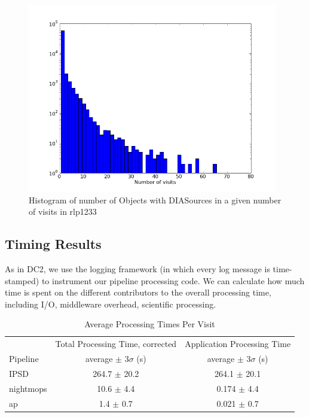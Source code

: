 \begin{figure}[htb]
\begin{center}
\includegraphics[height=3.25in]{images/rlp1233DiffLCHisto.png}
\caption{Histogram of number of Objects with DIASources in a given number of
  visits in rlp1233}  
\label{fig:lightcurve1}
\end{center}
\end{figure}

  

\subsection{Timing Results}
\label{sec:timing}

As in DC2, we use the logging framework (in which every log message is
time-stamped) to instrument our pipeline processing code.  We can
calculate how much time is spent on the different contributors to the
overall processing time, including I/O, middleware overhead,
scientific processing.  

\begin{table}[ht]
\begin{center}
\caption{Average Processing Times Per Visit
\label{tbl:visitstats}}
\vspace{\baselineskip}
\begin{tabular}{ l | c | c }
\hline\hline
          & Total Processing Time, corrected
          & Application Processing Time \\ 
Pipeline  & average $\pm$  $3\sigma$ (s) & average $\pm$ $3\sigma$ (s) \\ \hline
IPSD      & 264.7 $\pm$ 20.2 & 264.1 $\pm$ 20.1  \\ 
nightmops & 10.6  $\pm$  4.4 & 0.174 $\pm$  4.4  \\ 
ap        & 1.4   $\pm$  0.7 & 0.021 $\pm$  0.7  \\ \hline
\hline
\end{tabular}

\end{center}
\end{table}


